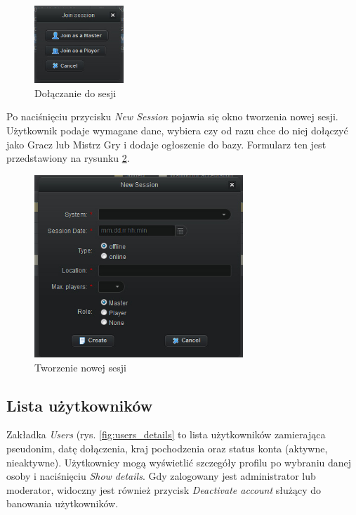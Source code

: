 \begin{figure}[htb]	
\centering
\includegraphics[width=0.3\textwidth]{./img/interfejsy/join_session}
\caption{Dołączanie do sesji}
\label{fig:join_session}
\end{figure}

Po naciśnięciu przycisku \emph{New Session} pojawia się okno tworzenia nowej sesji. Użytkownik podaje wymagane dane, wybiera czy od razu chce do niej dołączyć jako Gracz lub Mistrz Gry i dodaje ogłoszenie do bazy. Formularz ten jest przedstawiony na rysunku \ref{fig:create_session}.

\begin{figure}[htb]	
\centering
\includegraphics[width=0.7\textwidth]{./img/interfejsy/create_session}
\caption{Tworzenie nowej sesji}
\label{fig:create_session}
\end{figure}




\subsection{Lista użytkowników}
\label{sec:users_detail}
Zakładka \emph{Users} (rys. \ref{fig:users_details} to lista użytkowników zamierająca pseudonim, datę dołączenia, kraj pochodzenia oraz status konta (aktywne, nieaktywne). Użytkownicy mogą wyświetlić szczegóły profilu po wybraniu danej osoby i naciśnięciu \emph{Show details}. Gdy zalogowany jest administrator lub moderator, widoczny jest również przycisk \emph{Deactivate account} służący do banowania użytkowników. 

